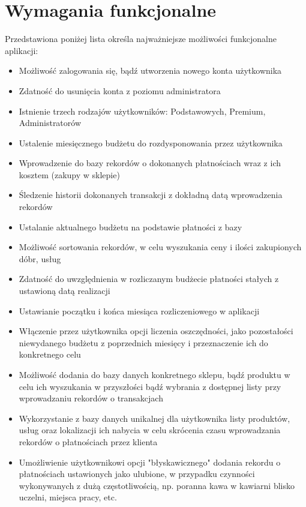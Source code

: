 \documentclass{article}
\begin{document}
    \section{Wymagania funkcjonalne}
    Przedstawiona poniżej lista określa najważniejsze możliwości 
funkcjonalne aplikacji:
    \begin{itemize}
    \item Możliwość zalogowania się, bądź utworzenia nowego konta 
użytkownika
    \item Zdatność do usunięcia konta z poziomu administratora
    \item Istnienie trzech rodzajów użytkowników: Podstawowych, Premium, 
Administratorów
    \item Ustalenie miesięcznego budżetu do rozdysponowania przez 
użytkownika
    \item Wprowadzenie do bazy rekordów o dokonanych płatnościach wraz z 
ich kosztem (zakupy w sklepie)
    \item Śledzenie historii dokonanych transakcji z dokładną datą 
wprowadzenia rekordów
    \item Ustalanie aktualnego budżetu na podstawie płatności z bazy
    \item Możliwość sortowania rekordów, w celu wyszukania ceny i ilości 
zakupionych dóbr, usług
    \item Zdatność do uwzględnienia w rozliczanym budżecie płatności 
stałych z ustawioną datą realizacji
    \item Ustawianie początku i końca miesiąca rozliczeniowego w 
aplikacji
    \item Włączenie przez użytkownika opcji liczenia oszczędności, jako 
pozostałości niewydanego budżetu z poprzednich miesięcy i przeznaczenie 
ich do konkretnego celu
    \item Możliwość dodania do bazy danych konkretnego sklepu, bądź 
produktu w celu ich wyszukania w przyszłości bądź wybrania z dostępnej 
listy przy wprowadzaniu rekordów o transakcjach
    \item Wykorzystanie z bazy danych unikalnej dla użytkownika listy 
produktów, usług oraz lokalizacji ich nabycia w celu skrócenia czasu 
wprowadzania rekordów o płatnościach przez klienta
    \item Umożliwienie użytkownikowi opcji "błyskawicznego" dodania 
rekordu o płatnościach ustawionych jako ulubione, w przypadku czynności 
wykonywanych z dużą częstotliwością, np. poranna kawa w kawiarni blisko 
uczelni, miejsca pracy, etc.
    \end{itemize}
    
\end{document}
